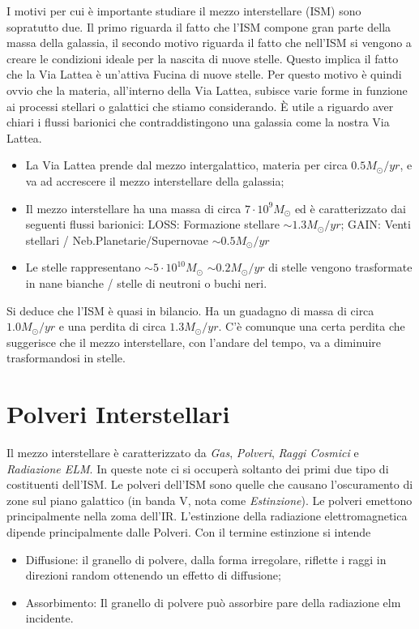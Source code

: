 I motivi per cui \`e importante studiare il mezzo interstellare (ISM) sono sopratutto due. Il primo riguarda il fatto che l'ISM compone gran parte della massa della galassia, il secondo motivo riguarda il fatto che nell'ISM si vengono a creare le condizioni ideale per la nascita di nuove stelle.
Questo implica il fatto che la Via Lattea \`e un'attiva Fucina di nuove stelle. Per questo motivo \`e quindi ovvio che la materia, all'interno della Via Lattea, subisce varie forme in funzione ai processi stellari o galattici che stiamo considerando. \`E utile a riguardo aver chiari i flussi barionici che contraddistingono una galassia come la nostra Via Lattea.
\begin{itemize}
		\item La Via Lattea prende dal mezzo intergalattico, materia per circa $0.5 M_{\odot}/yr$, e va ad accrescere il mezzo interstellare della galassia;
		\item Il mezzo interstellare ha una massa di circa $7\cdot 10^9 M_{\odot}$ ed \`e caratterizzato dai seguenti flussi barionici:
				\subitem LOSS: Formazione stellare $\sim 1.3 M_{\odot}/yr$;
				\subitem GAIN: Venti stellari / Neb.Planetarie/Supernovae $\sim 0.5 M_{\odot}/yr$
		\item Le stelle rappresentano $\sim 5\cdot 10^{10}M_{\odot}$
				\subitem $\sim 0.2 M_{\odot}/yr$ di stelle vengono trasformate in nane bianche / stelle di neutroni o buchi neri.
\end{itemize}
Si deduce che l'ISM \`e quasi in bilancio. Ha un guadagno di massa di circa $1.0 M_{\odot}/yr$ e una perdita di circa $1.3 M_{\odot}/yr$. C'\`e comunque una certa perdita che suggerisce che il mezzo interstellare, con l'andare del tempo, va a diminuire trasformandosi in stelle.
\section{Polveri Interstellari}
Il mezzo interstellare \`e caratterizzato da \emph{Gas}, \emph{Polveri}, \emph{Raggi Cosmici} e \emph{Radiazione ELM}. In queste note ci si occuper\`a soltanto dei primi due tipo di costituenti dell'ISM. Le polveri dell'ISM sono quelle che causano l'oscuramento di zone sul piano galattico (in banda V, nota come \emph{Estinzione}). Le polveri emettono principalmente nella zoma dell'IR. L'estinzione della radiazione elettromagnetica dipende principalmente dalle Polveri. Con il termine estinzione si intende
\begin{itemize}
		\item Diffusione: il granello di polvere, dalla forma irregolare, riflette i raggi in direzioni random ottenendo un effetto di diffusione;
		\item Assorbimento: Il granello di polvere pu\`o assorbire pare della radiazione elm incidente.
\end{itemize}

